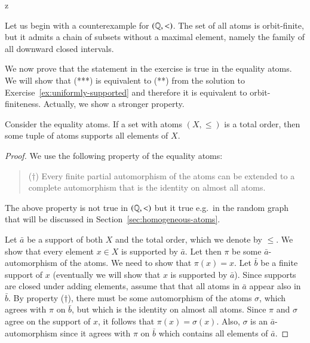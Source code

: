 z
{Let us begin with a counterexample for $(\mathbb Q, <)$. The set of all atoms is orbit-finite, but it admits a chain of subsets without a maximal element, namely the family of all downward closed intervals.

We now prove that the statement in the exercise is true in the equality atoms. We will show that (***) is equivalent to (**) from the solution to Exercise~\ref{ex:uniformly-supported} and therefore it is equivalent to orbit-finiteness. Actually, we show a stronger property. 

\begin{lemma}\label{lem:order-on-equality-atoms}
	Consider the equality atoms. If a set with atoms $(X,\le)$ is a total order, then some tuple of atoms supports all elements of $X$.
\end{lemma}
\begin{proof}
We use the following property of the equality atoms:
\begin{quote}
	($\dagger$) Every finite partial automorphism of the atoms can be extended to a complete automorphism that is the identity on almost all atoms.
\end{quote}
The above property is not true in $(\mathbb Q, <)$ but it true e.g.~in the random graph that will be discussed in Section~\ref{sec:homogeneous-atoms}.

Let $\bar a$ be a support of both $X$ and the total order, which we denote by $\le$. We show that every element $ x \in X$ is supported by $\bar a$. Let then $\pi$ be some $\bar a$-automorphism of the atoms. We need to show that $\pi(x)=x$. Let $\bar b$ be a finite support of $x$ (eventually we will show that $x$ is supported by $\bar a$). Since supports are closed under adding elements, assume that that all atoms in $\bar a$ appear also in $\bar b$. By property ($\dagger$), there must be some automorphism of the atoms $\sigma$, which agrees with $\pi$ on $\bar b$, but which is the identity on almost all atoms. Since $\pi$ and $\sigma$ agree on the support of $x$, it follows that $\pi(x)=\sigma(x)$. Also, $\sigma$ is an $\bar a$-automorphism since it agrees with $\pi$ on $\bar b$ which contains all elements of $\bar a$.


\end{proof}}

